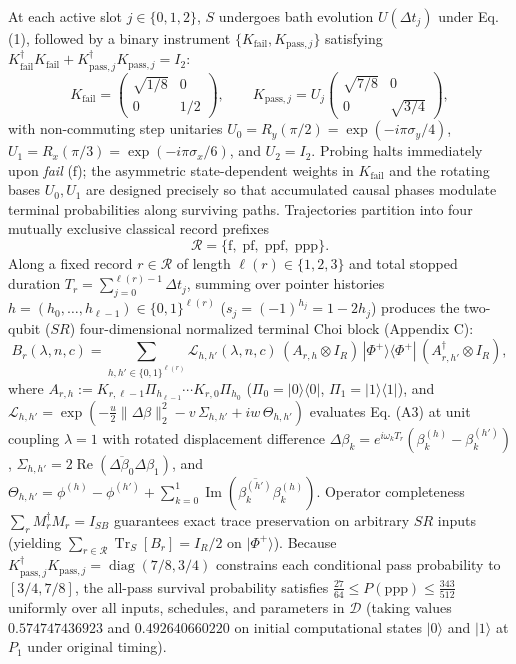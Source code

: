\documentclass[11pt,letterpaper]{article}
\theoremstyle{definition}
\begin{document}
At each active slot \(j \in \{0, 1, 2\}\), \(S\) undergoes bath
evolution \(U(\Delta t_j)\) under Eq. (1), followed by a binary
instrument \(\{K_{\mathrm{fail}}, K_{\mathrm{pass}, j}\}\) satisfying
\(K_{\mathrm{fail}}^\dagger K_{\mathrm{fail}} + K_{\mathrm{pass}, j}^\dagger K_{\mathrm{pass}, j} = I_2\):
\[K_{\mathrm{fail}} = \begin{pmatrix} \sqrt{1/8} & 0 \\ 0 & 1/2 \end{pmatrix}, \qquad K_{\mathrm{pass}, j} = U_j \begin{pmatrix} \sqrt{7/8} & 0 \\ 0 & \sqrt{3/4} \end{pmatrix},
\tag{17}\] with non-commuting step unitaries
\(U_0 = R_y(\pi/2) = \exp(-i\pi\sigma_y/4)\),
\(U_1 = R_x(\pi/3) = \exp(-i\pi\sigma_x/6)\), and \(U_2 = I_2\). Probing
halts immediately upon \emph{fail} (\(\mathrm{f}\)); the asymmetric
state-dependent weights in \(K_{\mathrm{fail}}\) and the rotating bases
\(U_0, U_1\) are designed precisely so that accumulated causal phases
modulate terminal probabilities along surviving paths. Trajectories
partition into four mutually exclusive classical record prefixes
\[\mathcal{R} = \{\mathrm{f},\; \mathrm{pf},\; \mathrm{ppf},\; \mathrm{ppp}\}.
\tag{18}\] Along a fixed record \(r \in \mathcal{R}\) of length
\(\ell(r) \in \{1, 2, 3\}\) and total stopped duration
\(T_r = \sum_{j=0}^{\ell(r)-1}\Delta t_j\), summing over pointer
histories \(h = (h_0, \dots, h_{\ell-1}) \in \{0, 1\}^{\ell(r)}\)
(\(s_j = (-1)^{h_j} = 1 - 2h_j\)) produces the two-qubit (\(SR\))
four-dimensional normalized terminal Choi block (Appendix C):
\[B_r(\lambda, n, c) = \sum_{h, h' \in \{0,1\}^{\ell(r)}} \mathcal{L}_{h, h'}(\lambda, n, c)\, (A_{r, h} \otimes I_R)\, |\Phi^+\rangle\langle\Phi^+|\, (A_{r, h'}^\dagger \otimes I_R),
\tag{19}\] where
\(A_{r, h} := K_{r,\ell-1}\Pi_{h_{\ell-1}}\cdots K_{r,0}\Pi_{h_0}\)
(\(\Pi_0 = |0\rangle\langle 0|\), \(\Pi_1 = |1\rangle\langle 1|\)), and
\(\mathcal{L}_{h, h'} = \exp(-\frac{u}{2}\|\Delta\beta\|_2^2 - v\,\Sigma_{h,h'} + i w\,\Theta_{h,h'})\)
evaluates Eq. (A3) at unit coupling \(\lambda = 1\) with rotated
displacement difference
\(\Delta\beta_k = e^{i\omega_k T_r}(\beta_k^{(h)} - \beta_k^{(h')})\),
\(\Sigma_{h,h'} = 2\operatorname{Re}(\overline{\Delta\beta_0}\Delta\beta_1)\),
and
\(\Theta_{h,h'} = \phi^{(h)} - \phi^{(h')} + \sum_{k=0}^1 \operatorname{Im}(\overline{\beta_k^{(h')}}\beta_k^{(h)})\).
Operator completeness \(\sum_r M_r^\dagger M_r = I_{SB}\) guarantees
exact trace preservation on arbitrary \(SR\) inputs (yielding
\(\sum_{r \in \mathcal{R}} \operatorname{Tr}_S[B_r] = I_R/2\) on
\(|\Phi^+\rangle\)). Because
\(K_{\mathrm{pass}, j}^\dagger K_{\mathrm{pass}, j} = \operatorname{diag}(7/8, 3/4)\)
constrains each conditional pass probability to \([3/4, 7/8]\), the
all-pass survival probability satisfies
\(\frac{27}{64} \le P(\mathrm{ppp}) \le \frac{343}{512}\) uniformly over
all inputs, schedules, and parameters in \(\mathcal{D}\) (taking values
\(0.574747436923\) and \(0.492640660220\) on initial computational
states \(|0\rangle\) and \(|1\rangle\) at \(P_1\) under original
timing).
\end{document}
